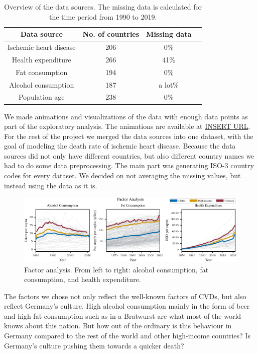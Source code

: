 \begin{table}[h]
    \centering
    \caption{Overview of the data sources. The missing data is calculated for the time period from 1990 to 2019.}
    \label{Data overview}
    \begin{tabular}{|c|c|c|c|}
    \hline
    Data source & No. of countries & Missing data\\
    \hline
    Ischemic heart disease & 206 & 0\%\\
    Health expenditure & 266 & 41\%\\
    Fat consumption & 194 & 0\%\\
    Alcohol consumption & 187 & a lot\%\\
    Population age & 238 & 0\%\\
    \hline
    \end{tabular}
\end{table}

We made animations and visualizations of the data with enough data points as part of the exploratory analysis. The animations are available at \url{INSERT URL}. 
For the rest of the project we merged the data sources into one dataset, with the goal of modeling the death rate of ischemic heart disease. Because the data sources did not 
only have different countries, but also different country names we had to do some data preprocessing. The main part was generating ISO-3 country codes for every dataset. 
We decided on not averaging the missing values, but instead using the data as it is.



\begin{figure}[ht]
    \vskip 0.2in
    \centering
    \centerline{\includegraphics[]{fig/fig_factor_analysis.pdf}}
    \caption{Factor analysis. From left to right: alcohol consumption, fat consumption, and health expenditure. }
    \label{Factor analysis}
\end{figure}

The factors we chose not only reflect the well-known factors of CVDs, but also reflect Germany's culture. High alcohol consumption mainly in the form of beer and high fat consumption such as in a Bratwurst are what most of the world knows about this nation. But how out of the ordinary is this behaviour in Germany compared to the rest of the world and other high-income countries? Is Germany's culture pushing them towards a quicker death?


